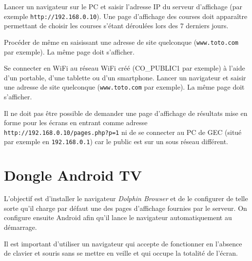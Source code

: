 \documentclass[a4paper]{ffco-rapport}
\begin{document}
	Lancer un navigateur sur le PC et saisir l'adresse IP du serveur d'affichage (par exemple \texttt{http://192.168.0.10}). Une page d'affichage des courses doit apparaître permettant de choisir les courses s'étant déroulées lors des 7 derniers jours.
	
	Procéder de même en saisissant une adresse de site quelconque (\texttt{www.toto.com} par exemple). La même page doit s'afficher.
	
	Se connecter en WiFi au réseau WiFi créé (CO\_PUBLIC1 par exemple) à l'aide d'un portable, d'une tablette ou d'un smartphone. Lancer un navigateur et saisir une adresse de site quelconque (\texttt{www.toto.com} par exemple). La même page doit s'afficher.
	
	Il ne doit pas être possible de demander une page d'affichage de résultats mise en forme pour les écrans en entrant comme adresse \texttt{http://192.168.0.10/pages.php?p=1} ni de se connecter au PC de GEC (situé par exemple en \texttt{192.168.0.1}) car le public est sur un sous réseau différent.
		
\chapter{Dongle Android TV}

	L'objectif est d'installer le navigateur \emph{Dolphin Browser} et de le configurer de telle sorte qu'il charge par défaut une des pages d'affichage fournies par le serveur. On configure ensuite Android afin qu'il lance le navigateur automatiquement au démarrage.
	
	Il est important d'utiliser un navigateur qui accepte de fonctionner en l'absence de clavier et souris sans se mettre en veille et qui occupe la totalité de l'écran.
	
	\newcommand{\ico}[1]{\texttt{[image: icone\#1.jpg]}}
	
\end{document}
